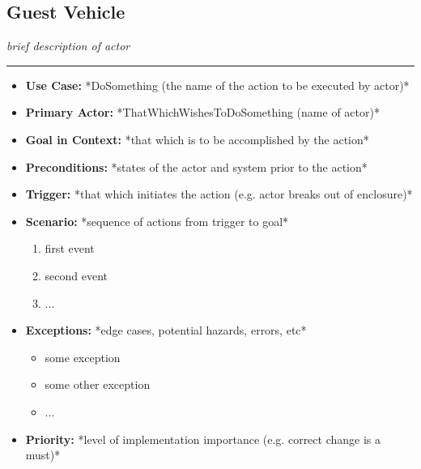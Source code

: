 \documentclass[12pt]{article}
\begin{document}
    \subsection{Guest Vehicle}
    \textit{brief description of actor}
    \par\noindent\rule{\textwidth}{0.4pt}    
    \begin{itemize} %
        \item[]\textbf{Use Case:}                                
            *DoSomething (the name of the action to be executed by actor)*

        \item[]\textbf{Primary Actor:}
            *ThatWhichWishesToDoSomething (name of actor)*

        \item[]\textbf{Goal in Context:}
            *that which is to be accomplished by the action*

        \item[]\textbf{Preconditions:}
            *states of the actor and system prior to the action*

        \item[]\textbf{Trigger:}
            *that which initiates the action (e.g. actor breaks out of enclosure)*

        \item[]\textbf{Scenario:}
            *sequence of actions from trigger to goal*
            \begin{enumerate}
                \item first event
                \item second event
                \item ...
            \end{enumerate}

        \item[]\textbf{Exceptions:}
            *edge cases, potential hazards, errors, etc*
            \begin{itemize}
                \item[] some exception
                \item[] some other exception                
                \item[] ...
            \end{itemize}

        \item[]\textbf{Priority:}
            *level of implementation importance (e.g. correct change is a must)*


\end{itemize}
\end{document}
